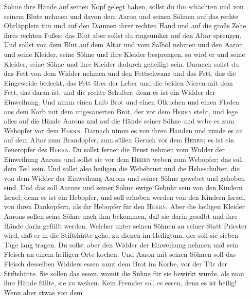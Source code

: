Söhne ihre Hände auf seinen Kopf gelegt haben,  sollst du
ihn schächten und von seinem Blute nehmen und davon dem Aaron und seinen
Söhnen auf das rechte Ohrläpplein tun und auf den Daumen ihrer rechten
Hand und auf die große Zehe ihres rechten Fußes; das Blut aber sollst du
ringsumher auf den Altar sprengen.  Und sollst von dem
Blut auf dem Altar und vom Salböl nehmen und den Aaron und seine
Kleider, seine Söhne und ihre Kleider besprengen, so wird er und seine
Kleider, seine Söhne und ihre Kleider dadurch geheiligt sein.
 Darnach sollst du das Fett von dem Widder nehmen und den
Fettschwanz und das Fett, das die Eingeweide bedeckt, das Fett über der
Leber und die beiden Nieren mit dem Fett, das daran ist, und die rechte
Schulter; denn es ist ein Widder der Einweihung.  Und
nimm einen Laib Brot und einen Ölkuchen und einen Fladen aus dem Korb
mit dem ungesäuerten Brot, der vor dem \textsc{Herrn} steht,
 und lege alles auf die Hände Aarons und auf die Hände
seiner Söhne und webe es zum Webopfer vor dem \textsc{Herrn}.
 Darnach nimm es von ihren Händen und zünde es an auf dem
Altar zum Brandopfer, zum süßen Geruch vor dem \textsc{Herrn}; es ist
ein Feueropfer des \textsc{Herrn}.  Du sollst ferner die
Brust nehmen vom Widder der Einweihung Aarons und sollst sie vor dem
\textsc{Herrn} weben zum Webopfer; das soll dein Teil sein.
 Und sollst also heiligen die Webebrust und die
Hebeschulter, die von dem Widder der Einweihung Aarons und seiner Söhne
gewebet und gehoben sind.  Und das soll Aarons und seiner
Söhne ewige Gebühr sein von den Kindern Israel; denn es ist ein
Hebopfer, und soll erhoben werden von den Kindern Israel, von ihren
Dankopfern, als ihr Hebopfer für den \textsc{Herrn}. 
Aber die heiligen Kleider Aarons sollen seine Söhne nach ihm bekommen,
daß sie darin gesalbt und ihre Hände darin gefüllt werden.
 Welcher unter seinen Söhnen an seiner Statt Priester
wird, daß er in die Stiftshütte gehe, zu dienen im Heiligtum, der soll
sie sieben Tage lang tragen.  Du sollst aber den Widder
der Einweihung nehmen und sein Fleisch an einem heiligen Orte kochen.
 Und Aaron mit seinen Söhnen soll das Fleisch desselben
Widders essen samt dem Brot im Korbe, vor der Tür der Stiftshütte.
 Sie sollen das essen, womit die Sühne für sie bewirkt
wurde, als man ihre Hände füllte, sie zu weihen. Kein Fremder soll es
essen, denn es ist heilig!  Wenn aber etwas von dem
